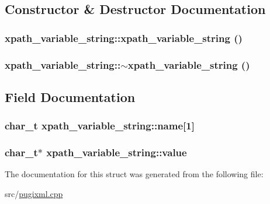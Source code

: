 \subsection{Constructor \& Destructor Documentation}
\hypertarget{structxpath__variable__string_a119d348b7f76371928faa5f5f80df815}{
\subsubsection[{xpath\_\-variable\_\-string}]{\setlength{\rightskip}{0pt plus 5cm}xpath\_\-variable\_\-string::xpath\_\-variable\_\-string ()}}
\label{structxpath__variable__string_a119d348b7f76371928faa5f5f80df815}
\hypertarget{structxpath__variable__string_a8e5e421f2e963e6196d2812a623ee912}{
\subsubsection[{$\sim$xpath\_\-variable\_\-string}]{\setlength{\rightskip}{0pt plus 5cm}xpath\_\-variable\_\-string::$\sim$xpath\_\-variable\_\-string ()}}
\label{structxpath__variable__string_a8e5e421f2e963e6196d2812a623ee912}


\subsection{Field Documentation}
\hypertarget{structxpath__variable__string_a5c43cdcc55a620db0e7bdd29b4d56e89}{
\subsubsection[{name}]{\setlength{\rightskip}{0pt plus 5cm}char\_\-t {\bf xpath\_\-variable\_\-string::name}\mbox{[}1\mbox{]}}}
\label{structxpath__variable__string_a5c43cdcc55a620db0e7bdd29b4d56e89}
\hypertarget{structxpath__variable__string_aeb8a87a8457d2615cd7b766fd3f30559}{
\subsubsection[{value}]{\setlength{\rightskip}{0pt plus 5cm}char\_\-t$\ast$ {\bf xpath\_\-variable\_\-string::value}}}
\label{structxpath__variable__string_aeb8a87a8457d2615cd7b766fd3f30559}


The documentation for this struct was generated from the following file:\begin{DoxyCompactItemize}
\item 
src/\hyperlink{pugixml_8cpp}{pugixml.cpp}\end{DoxyCompactItemize}

